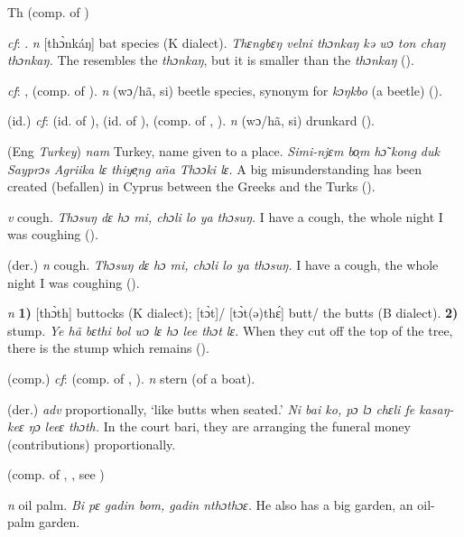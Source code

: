 \begin{letter}{Th}
 (comp. of ) 

 \textit{cf}: . \textit{n} [thɔ̀nkáŋ] bat species (K dialect). \textit{Thɛngbɛŋ velni thɔnkaŋ kə wɔ ton chaŋ thɔnkaŋ.} The  resembles the \textit{thɔnkaŋ}, but it is smaller than the \textit{thɔnkaŋ} (\citealt{Pichl1967}). 

 \textit{cf}: ,  (comp. of ). \textit{n} (wɔ/hã, si) beetle species, synonym for \textit{kɔŋkbo} (a beetle) (\citealt{Pichl1967}). 

 (id.) \textit{cf}:  (id. of ),  (id. of ),  (comp. of , ). \textit{n} (wɔ/hã, si) drunkard (\citealt{Pichl1967}). 

 (Eng \textit{Turkey}) \textit{nam} Turkey, name given to a place. \textit{Simi-njɛm bo̹m hɔ̃ kong duk Sayprɔs Agriika lɛ thiye̹ng aña Thɔɔki lɛ.} A big misunderstanding has been created (befallen) in Cyprus between the Greeks and the Turks (\citealt{Pichl1967}). 

 \textit{v} cough. \textit{Thɔsuŋ dɛ hɔ mi, chɔli lo ya thɔsuŋ.} I have a cough, the whole night I was coughing (\citealt{Pichl1967}).

 (der.) \textit{n} cough. \textit{Thɔsuŋ dɛ hɔ mi, chɔli lo ya thɔsuŋ.} I have a cough, the whole night I was coughing (\citealt{Pichl1967}).

 \textit{n} \textbf{1)} [thɔ̀th] buttocks (K dialect); [tɔ̀t]/ [tɔ̀t(ə)thɛ́] butt/ the butts (B dialect). \textbf{2)} stump. \textit{Ye hã bɛthi bol wɔ lɛ hɔ lee thɔt lɛ.} When they cut off the top of the tree, there is the stump which remains (\citealt{Pichl1967}). 

 (comp.) \textit{cf}:  (comp. of , ). \textit{n} stern (of a boat). 

 (der.) \textit{adv} proportionally, ‘like butts when seated.' \textit{Ni bai ko, pɔ lɔ chɛli fe kasaŋ-keɛ ŋɔ leeɛ thɔth.} In the court bari, they are arranging the funeral money (contributions) proportionally.

 (comp. of , , see ) 

 \textit{n} oil palm. \textit{Bi pɛ gadin bom, gadin nthɔthɔɛ.} He also has a big garden, an oil-palm garden.


\end{letter}
